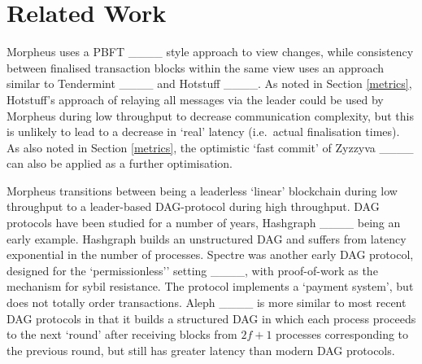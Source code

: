 \section{Related Work}
\label{rw} 

 Morpheus uses a PBFT ____ style approach to view changes, while consistency between finalised transaction blocks within the same view uses an approach similar to Tendermint ____ and Hotstuff ____. As noted in Section \ref{metrics}, Hotstuff's approach of relaying all messages via the leader could be used by Morpheus during low throughput to decrease communication complexity, but this is unlikely to lead to a decrease in `real' latency (i.e.\ actual finalisation times). As also noted in Section \ref{metrics}, the optimistic `fast commit' of Zyzzyva ____ can also be applied as a further optimisation. 

 \vspace{0.2cm} 
 Morpheus transitions between being a leaderless `linear' blockchain during low throughput to a leader-based DAG-protocol during high throughput. DAG protocols have been studied for a number of years, Hashgraph ____ being an early example. Hashgraph builds an unstructured DAG and suffers from latency exponential in the number of processes. Spectre was another early DAG protocol, designed for the `permissionless'' setting ____, with proof-of-work as the mechanism for sybil resistance. The protocol implements a `payment system', but does not totally order transactions.  Aleph ____ is more similar to most recent DAG protocols in that it builds a structured DAG in which each process proceeds to the next `round' after receiving blocks from $2f+1$ processes corresponding to the previous round, but still has greater  latency than modern DAG protocols.  

